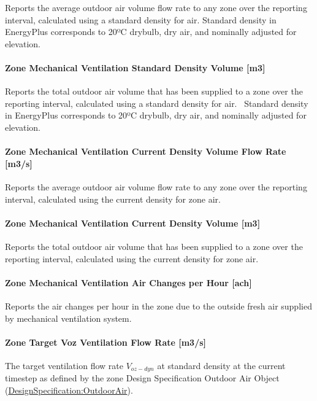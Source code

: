 Reports the average outdoor air volume flow rate to any zone over the reporting interval, calculated using a standard density for air. Standard density in EnergyPlus corresponds to 20ºC drybulb, dry air, and nominally adjusted for elevation.

\paragraph{Zone Mechanical Ventilation Standard Density Volume {[}m3{]}}\label{zone-mechanical-ventilation-standard-density-volume-m3}

Reports the total outdoor air volume that has been supplied to a zone over the reporting interval, calculated using a standard density for air.~ Standard density in EnergyPlus corresponds to 20ºC drybulb, dry air, and nominally adjusted for elevation.

\paragraph{Zone Mechanical Ventilation Current Density Volume Flow Rate {[}m3/s{]}}\label{zone-mechanical-ventilation-current-density-volume-flow-rate-m3s}

Reports the average outdoor air volume flow rate to any zone over the reporting interval, calculated using the current density for zone air.

\paragraph{Zone Mechanical Ventilation Current Density Volume {[}m3{]}}\label{zone-mechanical-ventilation-current-density-volume-m3}

Reports the total outdoor air volume that has been supplied to a zone over the reporting interval, calculated using the current density for zone air.

\paragraph{Zone Mechanical Ventilation Air Changes per Hour {[}ach{]}}\label{zone-mechanical-ventilation-air-changes-per-hour-ach}

Reports the air changes per hour in the zone due to the outside fresh air supplied by mechanical ventilation system.

\paragraph{Zone Target Voz Ventilation Flow Rate {[}m3/s{]}}\label{zone-target-voz-ventilation-flow-rate}
The target ventilation flow rate \(V_{oz-dyn}\) at standard density at the current timestep as defined by the zone Design Specification Outdoor Air Object (\hyperref[designspecificationoutdoorair]{DesignSpecification:OutdoorAir}).

